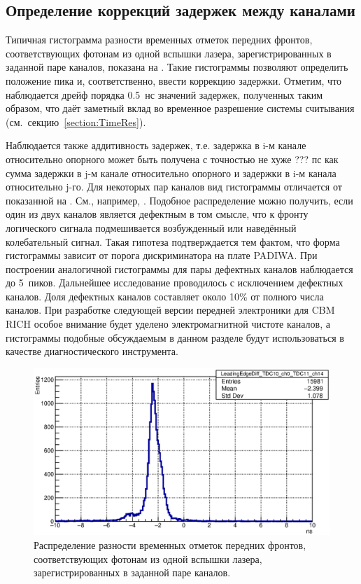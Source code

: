 \subsection{Определение коррекций задержек между каналами}\label{section:Corrections}

Типичная гистограмма разности временных отметок передних фронтов, соответствующих фотонам из одной вспышки лазера, зарегистрированных в заданной паре каналов, показана на . Такие гистограммы позволяют определить положение пика и, соответственно, ввести коррекцию задержки. Отметим, что наблюдается дрейф порядка 0.5~нс значений задержек, полученных таким образом, что даёт заметный вклад во временное разрешение системы считывания (см.~секцию~\ref{section:TimeRes}).

Наблюдается также аддитивность задержек, т.е. задержка в i-м канале относительно опорного может быть получена с точностью не хуже ??? пс как сумма задержки в j-м канале относительно опорного и задержки в i-м канала относительно j-го. Для некоторых пар каналов вид гистограммы отличается от показанной на . См., например, . Подобное распределение можно получить, если один из двух каналов является дефектным в том смысле, что к фронту логического сигнала подмешивается возбужденный или наведённый колебательный сигнал. Такая гипотеза подтверждается тем фактом, что форма гистограммы зависит от порога дискриминатора на плате PADIWA. При построении аналогичной гистограммы для пары дефектных каналов наблюдается до 5~пиков. Дальнейшее исследование проводилось с исключением дефектных каналов. Доля дефектных каналов составляет около 10\% от полного числа каналов. При разработке следующей версии передней электроники для CBM RICH особое внимание будет уделено электромагнитной чистоте каналов, а гистограммы подобные обсуждаемым в данном разделе будут использоваться в качестве диагностического инструмента.


\begin{figure}
\includegraphics[width=1.0\textwidth]{pictures/22_LeadingEdgeDiff_TDC10_ch0_TDC11_ch14.eps}
\caption{Распределение разности временных отметок передних фронтов, соответствующих фотонам из одной вспышки лазера, зарегистрированных в заданной паре каналов.}
\label{fig:TypicalLeadingEdgeDiff}
\end{figure}

